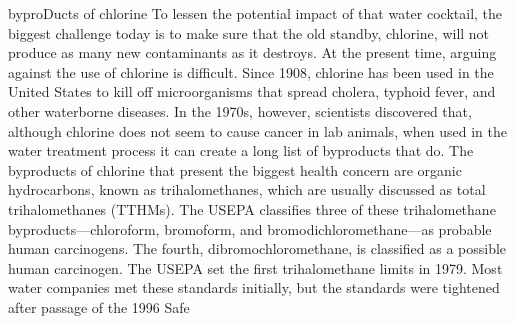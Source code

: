 \documentclass{article}
\begin{document}
byproDucts of chlorine To lessen the potential impact of that water
cocktail, the biggest challenge today is to make sure that the old
standby, chlorine, will not produce as many new contaminants as it
destroys. At the present time, arguing against the use of chlorine is
difficult. Since 1908, chlorine has been used in the United States to
kill off microorganisms that spread cholera, typhoid fever, and other
waterborne diseases. In the 1970s, however, scientists discovered that,
although chlorine does not seem to cause cancer in lab animals, when
used in the water treatment process it can create a long list of
byproducts that do. The byproducts of chlorine that present the biggest
health concern are organic hydrocarbons, known as trihalomethanes, which
are usually discussed as total trihalomethanes (TTHMs). The USEPA
classifies three of these trihalomethane byproducts---chloroform,
bromoform, and bromodichloromethane---as probable human carcinogens. The
fourth, dibromochloromethane, is classified as a possible human
carcinogen. The USEPA set the first trihalomethane limits in 1979. Most
water companies met these standards initially, but the standards were
tightened after passage of the 1996 Safe
\end{document}
